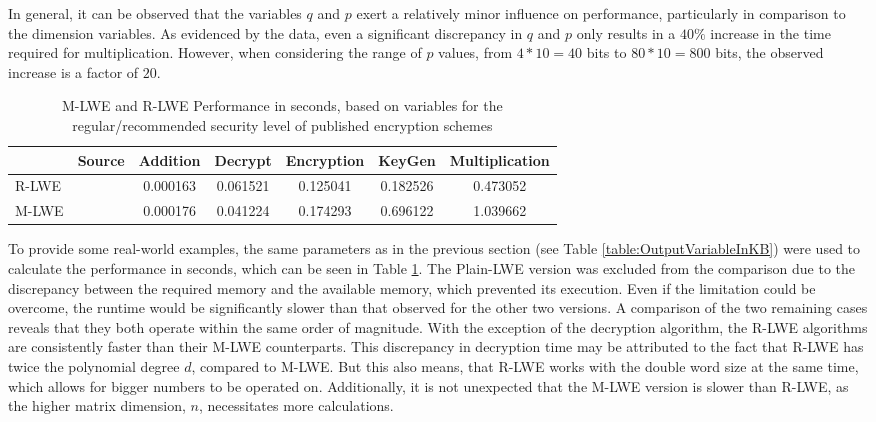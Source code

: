 In general, it can be observed that the variables $q$ and $p$ exert a relatively minor influence on performance, particularly in comparison to the dimension variables. As evidenced by the data, even a significant discrepancy in $q$ and $p$ only results in a $40\%$ increase in the time required for multiplication. However, when considering the range of $p$ values, from $4*10=40$ bits to $80*10=800$ bits, the observed increase is a factor of $20$.


\begin{table}[htp]
  \centering
  \caption{M-LWE and R-LWE Performance in seconds, based on variables for the regular/recommended security level of published encryption schemes}
  \begin{tabular}{|l|c||c|c|c|c|c|}
    \toprule
          & Source                      & Addition & Decrypt  & Encryption & KeyGen   & Multiplication \\
    \midrule
    R-LWE & \cite{PracticalKeyExchange} & 0.000163 & 0.061521 & 0.125041   & 0.182526 & 0.473052       \\
    M-LWE & \cite{CyrstalsKyber}        & 0.000176 & 0.041224 & 0.174293   & 0.696122 & 1.039662       \\
    \bottomrule
  \end{tabular}
  \label{table:performanceComparison}
\end{table}

To provide some real-world examples, the same parameters as in the previous section (see Table \ref{table:OutputVariableInKB}) were used to calculate the performance in seconds, which can be seen in Table \ref{table:performanceComparison}. The Plain-LWE version was excluded from the comparison due to the discrepancy between the required memory and the available memory, which prevented its execution. Even if the limitation could be overcome, the runtime would be significantly slower than that observed for the other two versions. A comparison of the two remaining cases reveals that they both operate within the same order of magnitude. With the exception of the decryption algorithm, the R-LWE algorithms are consistently faster than their M-LWE counterparts. This discrepancy in decryption time may be attributed to the fact that R-LWE has twice the polynomial degree $d$, compared to M-LWE. But this also means, that R-LWE works with the double word size at the same time, which allows for bigger numbers to be operated on. Additionally, it is not unexpected that the M-LWE version is slower than R-LWE, as the higher matrix dimension, $n$, necessitates more calculations.

